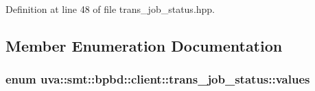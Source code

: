 Definition at line 48 of file trans\+\_\+job\+\_\+status.\+hpp.



\subsection{Member Enumeration Documentation}
\hypertarget{classuva_1_1smt_1_1bpbd_1_1client_1_1trans__job__status_a80cd5ec4a7e4de9541f48e6b5ccb866d}{}
\subsubsection[{values}]{\setlength{\rightskip}{0pt plus 5cm}enum {\bf uva\+::smt\+::bpbd\+::client\+::trans\+\_\+job\+\_\+status\+::values}}\label{classuva_1_1smt_1_1bpbd_1_1client_1_1trans__job__status_a80cd5ec4a7e4de9541f48e6b5ccb866d}
